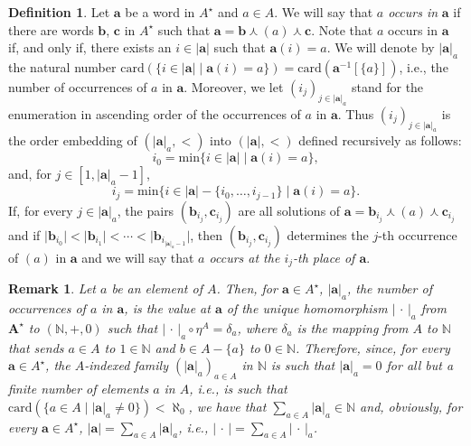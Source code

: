 \documentclass[a4paper, reqno
]{amsart}
\DeclareMathOperator{\bconcat}{\curlywedge}
\newcommand{\bb}[1]{\ensuremath{\lvert #1 \rvert}}
\theoremstyle{plain}
\newtheorem{remark}[theorem]{Remark}
\theoremstyle{definition}
\newtheorem{definition}[theorem]{Definition}
\begin{document}
\begin{definition}
Let $\mathbf{a}$ be a word in $A^{\star}$ and $a\in A$.
We will say that \emph{$a$ occurs in} $\mathbf{a}$ if there are words $\mathbf{b}$, $\mathbf{c}$ in $A^{\star}$ such that $\mathbf{a} = \mathbf{b}\bconcat(a)\bconcat \mathbf{c}$.
Note that $a$ occurs in $\mathbf{a}$ if, and only if, there exists an $i\in \bb{\mathbf{a}}$ such that $\mathbf{a}(i) = a$.
We will denote by $\bb{\mathbf{a}}_{a}$ the natural number $\mathrm{card}(\{i\in \bb{\mathbf{a}}\mid \mathbf{a}(i) = a\}) = \mathrm{card}(\mathbf{a}^{-1}[\{a\}])$, i.e., the number of occurrences of $a$ in $\mathbf{a}$.
Moreover, we let $(i_{j})_{j\in\bb{\mathbf{a}}_{a}}$ stand for the enumeration in ascending order of the occurrences of $a$ in $\mathbf{a}$.
Thus $(i_{j})_{j\in\bb{\mathbf{a}}_{a}}$ is the order embedding of $(\bb{\mathbf{a}}_{a},<)$ into $(\bb{\mathbf{a}},<)$ defined recursively as follows:
$$i_{0} = \mathrm{min}\{i\in \bb{\mathbf{a}}\mid \mathbf{a}(i) = a\},$$
and, for $j\in [1,\bb{\mathbf{a}}_{a}-1]$,
$$
i_{j} = \mathrm{min}\{i\in \bb{\mathbf{a}}-\{i_{0},\ldots,i_{j-1}\}\mid \mathbf{a}(i) = a\}.
$$
If, for every $j\in \bb{\mathbf{a}}_{a}$, the pairs $(\mathbf{b}_{i_{j}},\mathbf{c}_{i_{j}})$ are all solutions of $\mathbf{a} = \mathbf{b}_{i_{j}}\bconcat (a)\bconcat \mathbf{c}_{i_{j}}$ and if $\bb{\mathbf{b}_{i_{0}}}< \bb{\mathbf{b}_{i_{1}}}<\cdots<\bb{\mathbf{b}_{i_{\bb{\mathbf{a}}_{a}-1}}}$, then $(\mathbf{b}_{i_{j}},\mathbf{c}_{i_{j}})$ determines the $j$-th occurrence of $(a)$ in $\mathbf{a}$ and we will say that \emph{$a$ occurs at the $i_{j}$-th place of $\mathbf{a}$}.
\end{definition}

\begin{remark}\label{ROccurrences}
Let $a$ be an element of $A$.
Then, for $\mathbf{a}\in A^{\star}$, $\bb{\mathbf{a}}_{a}$, the number of occurrences of $a$ in $\mathbf{a}$, is the value at $\mathbf{a}$ of the unique homomorphism $\bb{\,\cdot\,}_{a}$ from $\mathbf{A}^{\star}$ to $(\mathbb{N},+,0)$ such that $\bb{\,\cdot\,}_{a}\circ\eta^{A} = \delta_{a}$, where $\delta_{a}$ is the mapping from $A$ to $\mathbb{N}$ that sends $a\in A$ to $1\in\mathbb{N}$ and $b\in A-\{a\}$ to $0\in \mathbb{N}$.
Therefore, since, for every $\mathbf{a}\in A^{\star}$, the $A$-indexed family $(\bb{\mathbf{a}}_{a})_{a\in A}$ in $\mathbb{N}$ is such that $\bb{\mathbf{a}}_{a} = 0$ for all but a finite number of elements $a$ in $A$, i.e., is such that $\mathrm{card}(\{a\in A\mid \bb{\mathbf{a}}_{a}\neq 0\})<\aleph_{0}$, we have that $\sum_{a\in A}\bb{\mathbf{a}}_{a}\in \mathbb{N}$ and, obviously, for every $\mathbf{a}\in A^{\star}$, $\bb{\mathbf{a}} = \sum_{a\in A}\bb{\mathbf{a}}_{a}$, i.e., $\bb{\,\cdot\,} = \sum_{a\in A}\bb{\,\cdot\,}_{a}$.
\end{remark}
\end{document}
